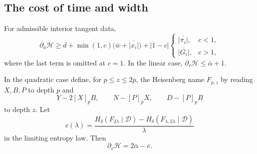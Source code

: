 \subsection{The cost of time and width}

\begin{proposition}\label{int:differential-cost}
For admissible interior tangent data,
\begin{equation}
 \partial_a\mathcal H\geq d+
 \min(1,c)\bigl(\bar w+\overline{|x_i|}\bigr)
 +|1-c|
 \begin{cases}
  \overline{|\pi_i|},&c<1,\\
  \overline{|G_i|},&c>1,
 \end{cases}
 \tag{time-rate}\label{eq:time-rate}
\end{equation}
where the last term is omitted at $c=1$. In the linear case,
$\partial_v\mathcal H\leq\bar\alpha+1$.

In the quadratic case define, for $p\leq z\leq2p$, the Heisenberg
name $F_{p,z}$ by reading $X,B,P$ to depth $p$ and
\[
 Y-2[X]_pB,\qquad N-[P]_pX,\qquad D-[P]_pB
\]
to depth $z$. Let
\begin{equation}\label{int:width-defect}
 e(\lambda)=\frac{H_\delta(F_{2\lambda}\mid\mathcal D)
                -H_\delta(F_{\lambda,2\lambda}\mid\mathcal D)}{\lambda}
\end{equation}
in the limiting entropy law. Then
\begin{equation}
 \partial_v\mathcal H=2\bar\alpha-\bar e.
 \tag{width-rate}\label{eq:width-rate}
\end{equation}
\end{proposition}

